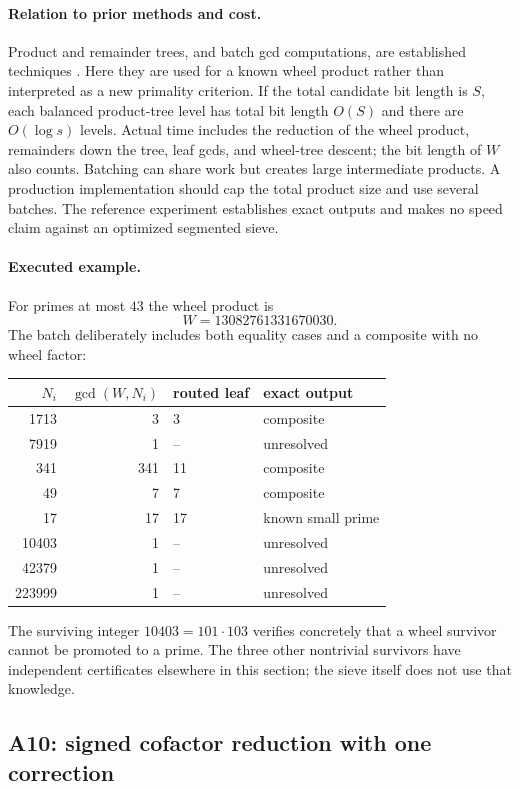 \documentclass[11pt,a4paper]{article}
\theoremstyle{definition}\newtheorem{definition}[theorem]{Definition}
\theoremstyle{remark}\newtheorem{remark}[theorem]{Remark}
\begin{document}
\paragraph{Relation to prior methods and cost.}
Product and remainder trees, and batch gcd computations, are established
techniques \cite{cert-batchgcd,arith-flint-crt}. Here they are used for a
known wheel product rather than interpreted as a new primality criterion.
If the total candidate bit length is $S$, each balanced product-tree level
has total bit length $O(S)$ and there are $O(\log s)$ levels. Actual time
includes the reduction of the wheel product, remainders down the tree,
leaf gcds, and wheel-tree descent; the bit length of $W$ also counts.
Batching can share work but creates large intermediate products. A production
implementation should cap the total product size and use several batches.
The reference experiment establishes exact outputs and makes no speed claim
against an optimized segmented sieve.

\paragraph{Executed example.}
For primes at most $43$ the wheel product is
\[
 W=13082761331670030.
\]
The batch deliberately includes both equality cases and a composite with
no wheel factor:
\begin{center}\small
\begin{tabular}{@{}rrll@{}}
\toprule
$N_i$ & $\gcd(W,N_i)$ & routed leaf & exact output\\
\midrule
1713 & 3 & 3 & composite\\
7919 & 1 & -- & unresolved\\
341 & 341 & 11 & composite\\
49 & 7 & 7 & composite\\
17 & 17 & 17 & known small prime\\
10403 & 1 & -- & unresolved\\
42379 & 1 & -- & unresolved\\
223999 & 1 & -- & unresolved\\
\bottomrule
\end{tabular}
\end{center}
The surviving integer $10403=101\cdot103$ verifies concretely that a wheel
survivor cannot be promoted to a prime. The three other nontrivial survivors
have independent certificates elsewhere in this section; the sieve itself
does not use that knowledge.

\subsection{A10: signed cofactor reduction with one correction}
\label{alg:A10}
\end{document}
